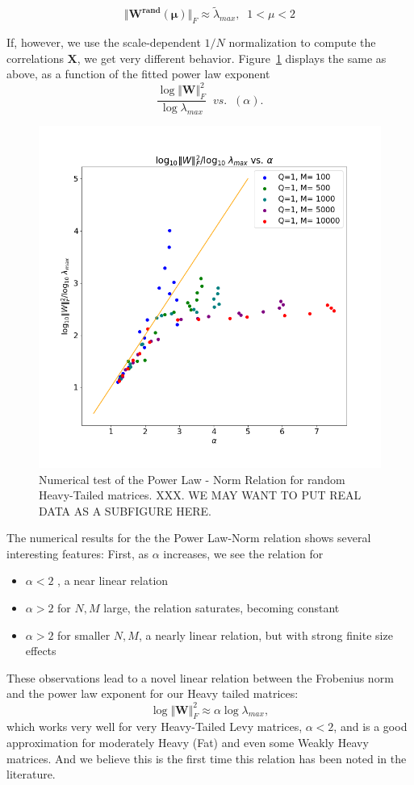 $$\Vert\mathbf{W^{rand}(\mu)}\Vert_{F}\approx\tilde{\lambda}_{max},\;\;1<\mu<2$$

If, however, we use the scale-dependent $1/N$ normalization to compute the correlations $\mathbf{X}$, we get very different behavior.
Figure~\ref{fig:randW} displays the same as above, as a function of the fitted power law exponent
$$
\dfrac{\log\Vert\mathbf{W}\Vert^{2}_{F}}{\log\lambda_{max}}\;\;vs.\;\;(\alpha)  .
$$

\begin{figure}[!htb]
 \centering
   \includegraphics[scale=0.40]{img/Alpha-LogNorm-Relations.png}
   \caption{
Numerical test of the  Power Law - Norm Relation for random Heavy-Tailed matrices.
XXX.  WE MAY WANT TO PUT REAL DATA AS A SUBFIGURE HERE.
}
  \label{fig:randW}
\end{figure}

The numerical results for the the Power Law-Norm relation shows several interesting features: 
First, as $\alpha$ increases, we see the relation for
\begin{itemize}
\item  $\alpha<2$ , a near linear relation 
\item  $\alpha>2$ for $N,M$ large, the relation saturates, becoming constant
\item   $\alpha>2$  for smaller $N,M$,  a nearly linear relation, but with strong finite size effects
\end{itemize}
These observations lead to a novel linear relation between the Frobenius norm and the power law exponent for our Heavy tailed matrices:
$$
\log\Vert\mathbf{W}\Vert^{2}_{F}\approx\alpha\log\lambda_{max}  ,
$$
which works very well for very Heavy-Tailed Levy matrices, $\alpha<2$, and is a good approximation for moderately Heavy (Fat) and even some Weakly Heavy matrices. 
And we believe this is the first time this relation has been noted in the literature.

